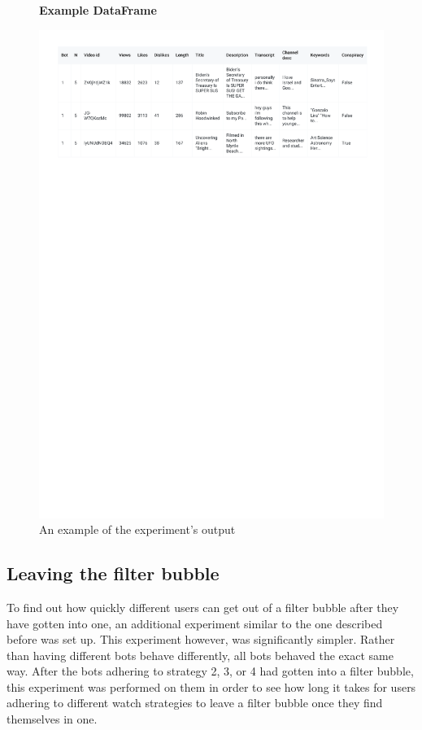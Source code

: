 \documentclass[../main.tex]{subfiles}
\begin{document}
\begin{figure}[t]
  \textbf{Example DataFrame}\par\medskip
  \centering
  \includegraphics[keepaspectratio, width=\textwidth]{images/df_example.pdf}
  \caption{An example of the experiment’s output}
  \label{fig:dataframe}

\end{figure}

\subsection{Leaving the filter bubble}
To find out how quickly different users can get out of a filter bubble after they have gotten into one,
an additional experiment similar to the one described before was set up. This experiment however, was 
significantly simpler. Rather than having different bots behave differently, all bots behaved the exact same
way. After the bots adhering to strategy 2, 3, or 4 had gotten into a filter bubble, this experiment was 
performed on them in order to see how long it takes for users adhering to different watch strategies to 
leave a filter bubble once they find themselves in one. 
\end{document}
